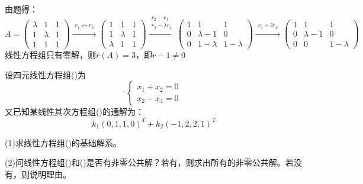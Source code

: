 \documentclass[a4paper]{report}
\begin{document}
\begin{jie}
由题得：
\begin{equation*}
A=
\begin{pmatrix}
\lambda&1&1\\
1&\lambda&1\\
1&1&1
\end{pmatrix}
\xrightarrow{\substack{r_1\leftrightarrow r_3}}
{
\begin{pmatrix}
1&1&1\\
1&\lambda&1\\
\lambda&1&1
\end{pmatrix}
}\xrightarrow{\substack{r_2-r_1\\ r_3-\lambda r_1}}
{
\begin{pmatrix}
1&1&1\\
0&\lambda-1&0\\
0&1-\lambda&1-\lambda
\end{pmatrix}
}\xrightarrow{\substack{r_3+2r_2}}
{
\begin{pmatrix}
1&1&1\\
0&\lambda-1&0\\
0&0&1-\lambda
\end{pmatrix}
}
\end{equation*}
线性方程组只有零解，则$r(A)=3$，即$r-1\neq 0$
\end{jie}

\EX 设四元线性方程组(\uppercase\expandafter{})为
\begin{equation*}
\begin{cases}
x_1+x_2=0\\
x_2-x_4=0
\end{cases}
\end{equation*}
又已知某线性其次方程组(\uppercase\expandafter{})的通解为：
\begin{equation*}
k_1(0,1,1,0)^T + k_2(-1,2,2,1)^T
\end{equation*}

(1)求线性方程组(\uppercase\expandafter{})的基础解系。

(2)问线性方程组(\uppercase\expandafter{})和(\uppercase\expandafter{})是否有非零公共解？若有，则求出所有的非零公共解。若没有，则说明理由。
\end{document}
